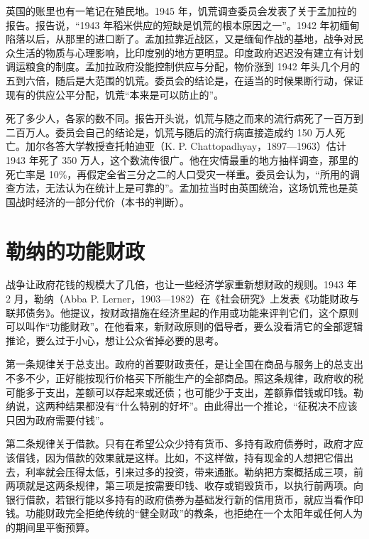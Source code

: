 英国的账里也有一笔记在殖民地。1945 年，饥荒调查委员会发表了关于孟加拉的报告\cite{famine1945}。报告说，“1943 年稻米供应的短缺是饥荒的根本原因之一”\cite{famine1945}。1942 年初缅甸陷落以后，从那里的进口断了\cite{famine1945}。孟加拉靠近战区，又是缅甸作战的基地，战争对民众生活的物质与心理影响，比印度别的地方更明显\cite{famine1945}。印度政府迟迟没有建立有计划调运粮食的制度\cite{famine1945}。孟加拉政府没能控制供应与分配，物价涨到 1942 年头几个月的五到六倍，随后是大范围的饥荒\cite{famine1945}。委员会的结论是，在适当的时候果断行动，保证现有的供应公平分配，饥荒“本来是可以防止的”\cite{famine1945}。

死了多少人，各家的数不同。报告开头说，饥荒与随之而来的流行病死了一百万到二百万人\cite{famine1945}。委员会自己的结论是，饥荒与随后的流行病直接造成约 150 万人死亡\cite{famine1945}。加尔各答大学教授查托帕迪亚（K. P. Chattopadhyay，1897—1963）估计 1943 年死了 350 万人，这个数流传很广\cite{famine1945,loc34}。他在灾情最重的地方抽样调查，那里的死亡率是 10\%，再假定全省三分之二的人口受灾一样重\cite{famine1945}。委员会认为，“所用的调查方法，无法认为在统计上是可靠的”\cite{famine1945}。孟加拉当时由英国统治，这场饥荒也是英国战时经济的一部分代价（本书的判断）。

\section{勒纳的功能财政}\label{sec:warfinance-lerner}

战争让政府花钱的规模大了几倍，也让一些经济学家重新想财政的规则。1943 年 2 月，勒纳（Abba P. Lerner，1903—1982）在《社会研究》上发表《功能财政与联邦债务》\cite{lerner1943,loc34}。他提议，按财政措施在经济里起的作用或功能来评判它们，这个原则可以叫作“功能财政”\cite{lerner1943}。在他看来，新财政原则的倡导者，要么没看清它的全部逻辑推论，要么过于小心，想让公众省掉必要的思考\cite{lerner1943}。

第一条规律关于总支出。政府的首要财政责任，是让全国在商品与服务上的总支出不多不少，正好能按现行价格买下所能生产的全部商品\cite{lerner1943}。照这条规律，政府收的税可能多于支出，差额可以存起来或还债；也可能少于支出，差额靠借钱或印钱\cite{lerner1943}。勒纳说，这两种结果都没有“什么特别的好坏”。由此得出一个推论，“征税决不应该只因为政府需要付钱”\cite{lerner1943}。

第二条规律关于借款。只有在希望公众少持有货币、多持有政府债券时，政府才应该借钱，因为借款的效果就是这样\cite{lerner1943}。比如，不这样做，持有现金的人想把它借出去，利率就会压得太低，引来过多的投资，带来通胀\cite{lerner1943}。勒纳把方案概括成三项，前两项就是这两条规律，第三项是按需要印钱、收存或销毁货币，以执行前两项\cite{lerner1943}。向银行借款，若银行能以多持有的政府债券为基础发行新的信用货币，就应当看作印钱\cite{lerner1943}。功能财政完全拒绝传统的“健全财政”的教条，也拒绝在一个太阳年或任何人为的期间里平衡预算\cite{lerner1943}。

